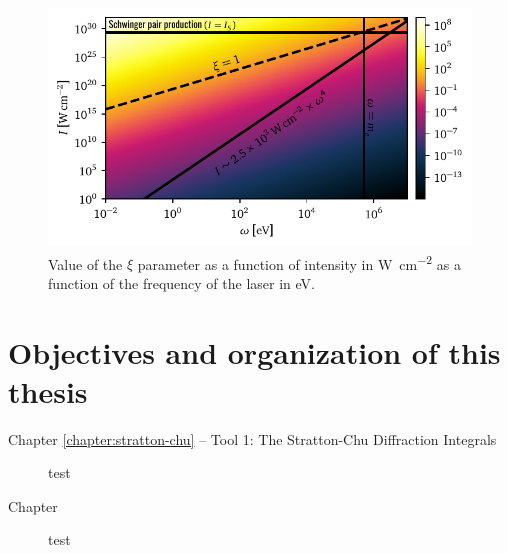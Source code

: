\documentclass[11pt,SymmetricalJury]{inrsthesis/inrsthesis}
\begin{document}
\begin{figure}
  \centering
  \includegraphics{figs/ClassicalLimit.pdf}
  \caption[Map of non-linearity parameters in intensity-frequency space.]
          {Value of the $\xi$ parameter as a function of intensity in \si{\watt\per\cm\squared}
          as a function of the frequency of the laser in \si{\eV}.}
  \label{fig:intro.xi-map}
\end{figure}

\section{Objectives and organization of this thesis}
\label{sec:intro.objectives}

\begin{description}
  \item[Chapter \ref{chapter:stratton-chu} -- Tool 1: The Stratton-Chu Diffraction Integrals]
  test
  \item[Chapter]
  test
\end{description}


\end{document}
